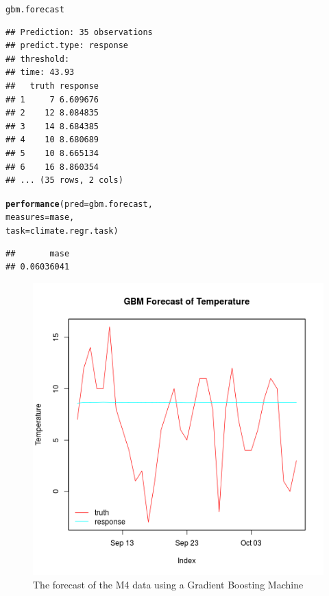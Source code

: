 \documentclass[12pt]{article}\usepackage[]{graphicx}\usepackage[]{color}
\makeatletter
\newcommand{\hlstd}[1]{\textcolor[rgb]{0.345,0.345,0.345}{#1}}%
\newcommand{\hlkwc}[1]{\textcolor[rgb]{0.333,0.667,0.333}{#1}}%
\newcommand{\hlkwd}[1]{\textcolor[rgb]{0.737,0.353,0.396}{\textbf{#1}}}%
\newenvironment{kframe}{%
 \def\at@end@of@kframe{}%
 \ifinner\ifhmode%
  \def\at@end@of@kframe{\end{minipage}}%
  \begin{minipage}{\columnwidth}%
 \fi\fi%
 \def\FrameCommand##1{\hskip\@totalleftmargin \hskip-\fboxsep
 \colorbox{shadecolor}{##1}\hskip-\fboxsep
     \hskip-\linewidth \hskip-\@totalleftmargin \hskip\columnwidth}%
 \MakeFramed {\advance\hsize-\width
   \@totalleftmargin\z@ \linewidth\hsize
   \@setminipage}}%
 {\par\unskip\endMakeFramed%
 \at@end@of@kframe}
\newenvironment{knitrout}{}{} %
\theoremstyle{definition}
\makeatother
\begin{document}
\begin{knitrout}
\color{fgcolor}\begin{kframe}
\begin{alltt}
\hlstd{gbm.forecast}
\end{alltt}
\begin{verbatim}
## Prediction: 35 observations
## predict.type: response
## threshold: 
## time: 43.93
##   truth response
## 1     7 6.609676
## 2    12 8.084835
## 3    14 8.684385
## 4    10 8.680689
## 5    10 8.665134
## 6    16 8.860354
## ... (35 rows, 2 cols)
\end{verbatim}
\begin{alltt}
\hlkwd{performance}\hlstd{(}\hlkwc{pred} \hlstd{= gbm.forecast,}
            \hlkwc{measures} \hlstd{= mase,}
            \hlkwc{task} \hlstd{= climate.regr.task)}
\end{alltt}
\begin{verbatim}
##       mase 
## 0.06036041
\end{verbatim}
\end{kframe}
\end{knitrout}

\doublespacing



\begin{figure}[h!]
\includegraphics[width=.8\linewidth]{plot_gbm_fore.png}
\centering
\caption{The forecast of the M4 data using a Gradient Boosting Machine}
\label{fig:gbm_final}
\end{figure}
\end{document}
